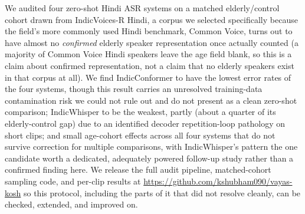 \documentclass[11pt]{article}
\begin{document}
We audited four zero-shot Hindi ASR systems on a matched elderly/control cohort drawn from
IndicVoices-R Hindi, a corpus we selected specifically because the field's more commonly used
Hindi benchmark, Common Voice, turns out to have almost no \emph{confirmed} elderly speaker
representation once actually counted (a majority of Common Voice Hindi speakers leave the age
field blank, so this is a claim about confirmed representation, not a claim that no elderly
speakers exist in that corpus at all). We find IndicConformer to have the lowest error rates of the
four systems, though this result carries an unresolved training-data contamination risk we could
not rule out and do not present as a clean zero-shot comparison; IndicWhisper to be the weakest,
partly (about a quarter of its elderly-control gap) due to an identified decoder repetition-loop
pathology on short clips; and small age-cohort effects across all four systems that do not survive
correction for multiple comparisons, with IndicWhisper's pattern the one candidate worth a
dedicated, adequately powered follow-up study rather than a confirmed finding here. We release the
full audit pipeline, matched-cohort sampling code, and per-clip results at
\url{https://github.com/kshubham090/vayas-kosh} so this protocol, including the parts of it that
did not resolve cleanly, can be checked, extended, and improved on.



\end{document}
